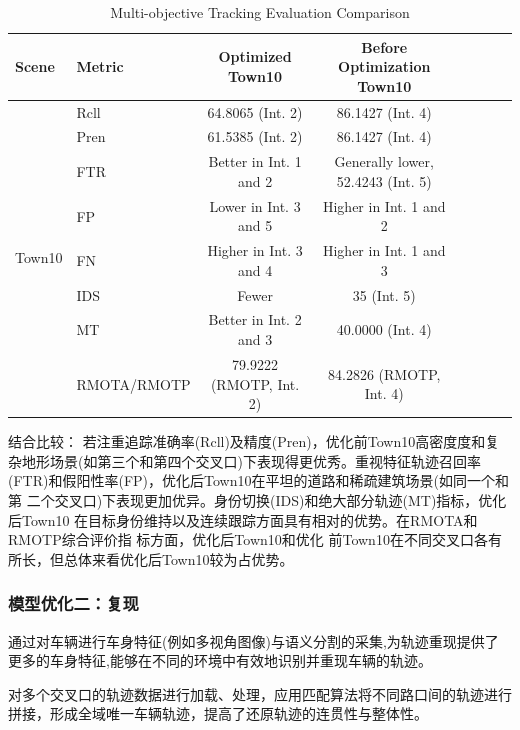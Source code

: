\begin{table}[htbp]
	\centering
	\caption{Multi-objective Tracking Evaluation Comparison}
	\label{tab:tracking_comparison}
	\begin{tabular}{@{}llcccccc@{}}
		\toprule
		\textbf{Scene} & \textbf{Metric} & \textbf{Optimized Town10} & \textbf{Before Optimization Town10} \\
		\midrule
		\multirow{8}{*}{Town10} 
		& Rcll & 64.8065 (Int. 2) & 86.1427 (Int. 4) \\
		& Pren & 61.5385 (Int. 2) & 86.1427 (Int. 4) \\
		& FTR & Better in Int. 1 and 2 & Generally lower, 52.4243 (Int. 5) \\
		& FP & Lower in Int. 3 and 5 & Higher in Int. 1 and 2 \\
		& FN & Higher in Int. 3 and 4 & Higher in Int. 1 and 3 \\
		& IDS & Fewer & 35 (Int. 5) \\
		& MT & Better in Int. 2 and 3 & 40.0000 (Int. 4) \\
		& RMOTA/RMOTP & 79.9222 (RMOTP, Int. 2) & 84.2826 (RMOTP, Int. 4) \\
		\bottomrule
	\end{tabular}
\end{table}



结合比较：
若注重追踪准确率(Rcll)及精度(Pren)，优化前Town10高密度度和复杂地形场景(如第三个和第四个交叉口)下表现得更优秀。重视特征轨迹召回率 (FTR)和假阳性率(FP)，优化后Town10在平坦的道路和稀疏建筑场景(如同一个和第 二个交叉口)下表现更加优异。身份切换(IDS)和绝大部分轨迹(MT)指标，优化后Town10 在目标身份维持以及连续跟踪方面具有相对的优势。在RMOTA和RMOTP综合评价指 标方面，优化后Town10和优化 前Town10在不同交叉口各有所长，但总体来看优化后Town10较为占优势。














\subsubsection{模型优化二：复现}

通过对车辆进行车身特征(例如多视角图像)与语义分割的采集,为轨迹重现提供了更多的车身特征,能够在不同的环境中有效地识别并重现车辆的轨迹。

对多个交叉口的轨迹数据进行加载、处理，应用匹配算法将不同路口间的轨迹进行拼接，形成全域唯一车辆轨迹，提高了还原轨迹的连贯性与整体性。

